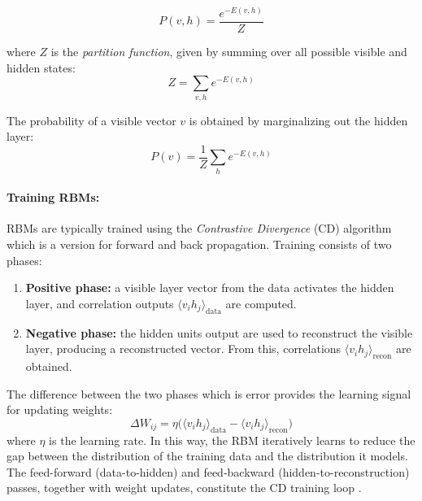 \[
P(v,h) = \frac{e^{-E(v,h)}}{Z}
\label{eqn:13}
\]

where $Z$ is the \textit{partition function}, given by summing over all possible visible and hidden states:
\[
Z = \sum_{v,h} e^{-E(v,h)}
\]

The probability of a visible vector $v$ is obtained by marginalizing out the hidden layer:
\[
P(v) = \frac{1}{Z} \sum_{h} e^{-E(v,h)}
\]

\paragraph{Training RBMs:} 
RBMs are typically trained using the \textit{Contrastive Divergence} (CD) algorithm which is a version for forward and back propagation. Training consists of two phases:

\begin{enumerate}
	\item \textbf{Positive phase:} a visible layer vector from the data activates the hidden layer, and correlation outputs $\langle v_i h_j \rangle_{\text{data}}$ are computed.
	\item \textbf{Negative phase:} the hidden units output are used to reconstruct the visible layer, producing a reconstructed vector. From this, correlations $\langle v_i h_j \rangle_{\text{recon}}$ are obtained.
\end{enumerate}

The difference between the two phases which is error provides the learning signal for updating weights:
\[
\Delta W_{ij} = \eta \Big( \langle v_i h_j \rangle_{\text{data}} - \langle v_i h_j \rangle_{\text{recon}} \Big)
\label{eqn:14}
\]
where $\eta$ is the learning rate. In this way, the RBM iteratively learns to reduce the gap between the distribution of the training data and the distribution it models. The feed-forward (data-to-hidden) and feed-backward (hidden-to-reconstruction) passes, together with weight updates, constitute the CD training loop \cite{RBM_GeeksforGeeks}.

